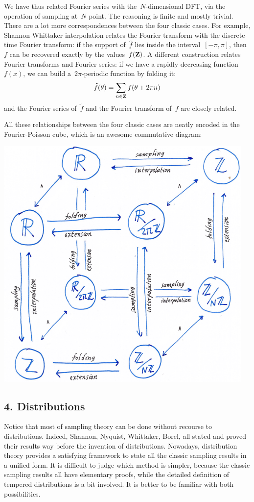 We have thus related Fourier series with the~$N$-dimensional DFT, via
the operation of sampling at~$N$ point.  The reasoning is finite and
mostly trivial.  There are a lot more correspondences between the
four classic cases.  For example, Shannon-Whittaker interpolation
relates the Fourier transform with the discrete-time Fourier
transform: if the support of~$\hat f$ lies inside the
interval~$[-\pi,\pi]$, then~$f$ can be recovered exactly by the
values~$f(\mathbf{Z})$.  A different construction relates Fourier transforms
and Fourier series: if we have a rapidly decreasing function~$f(x)$,
we can build a~$2\pi$-periodic function by folding it:
$$
\tilde f(\theta)=\sum_{n\in\mathbf{Z}} f(\theta+2\pi n)
$$
and the Fourier series of~$\tilde f$  and the Fourier transform
of~$f$ are closely related.

All these relationships between the four classic cases are neatly
encoded in the Fourier-Poisson cube, which is an awesome commutative
diagram:

\includegraphics{i/hfpcube.png}



\subsection{4. Distributions}

Notice that most of sampling theory can be done without recourse to
distributions.  Indeed, Shannon, Nyquist, Whittaker, Borel, all
stated and proved their results way before the invention of
distributions.  Nowadays, distribution theory provides a satisfying
framework to state all the classic sampling results in a unified
form.  It is difficult to judge which method is simpler, because the
classic sampling results all have elementary proofs, while the
detailed definition of tempered distributions is a bit involved.
It is better to be familiar with both possibilities.

